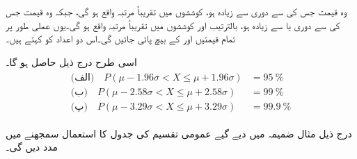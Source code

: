 وہ قیمت جس کی  سے دوری   سے زیادہ ہو،  کوششوں میں تقریباً    مرتبہ واقع ہو گی، جبکہ  وہ قیمت جس کی  سے دوری  یا   سے زیادہ ہو، بالترتیب   اور  کوششوں  میں تقریباً    مرتبہ واقع ہو گی۔یوں عملی طور پر تمام قیمتیں  اور  کے بیچ پائی جائیں گی۔اس دو اعداد کو  کہتے ہیں۔

اسی طرح درج ذیل حاصل ہو گا۔
\begin{gather}
\begin{aligned}\label{مساوات_شماریات_چند_نتائج}
\text{(الف)}\quad P(\mu-1.96\sigma<X\le \mu+1.96\sigma)&=\SI{95}{\percent}\\
\text{(ب)}\quad P(\mu-2.58\sigma<X\le \mu+2.58\sigma)&=\SI{99}{\percent}\\
\text{(پ)}\quad P(\mu-3.29\sigma<X\le \mu+3.29\sigma)&=\SI{99.9}{\percent}
\end{aligned}
\end{gather}

درج ذیل مثال ضمیمہ  میں دیے گیے عمومی تقسیم کی جدول کا استعمال سمجھنے میں مدد دیں گی۔

